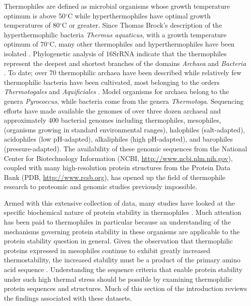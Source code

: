 Thermophiles are defined as microbial organisms whose growth temperature
optimum is above 50$^\circ$C while hyperthermophiles have optimal growth
temperatures of 80$^\circ$C or greater. Since Thomas Brock's description of the
hyperthermophilic bacteria \emph{Thermus aquaticus}, with a growth temperature
optimum of 70$^\circ$C, many other thermophiles and hyperthermophiles have been
isolated \cite{brock1969tag}.  Phylogenetic analysis of 16SrRNA indicate that
the thermophiles represent the deepest and shortest branches of the domains
\emph{Archaea} and \emph{Bacteria} \cite{PMID_10376671}.  To date; over 70
thermophilic archaea have been described while relatively few thermophilic
bacteria have been cultivated, most belonging to the orders
\emph{Thermotogales} and \emph{Aquificiales} \cite{PMID_11256505}. Model
organisms for archaea belong to the genera \emph{Pyrococcus}, while bacteria
come from the genera \emph{Thermotoga}. Sequencing efforts have made
available the genomes of over three dozen archaeal and approximately 400
bacterial genomes including thermophiles, mesophiles, (organisms growing in
standard environmental ranges), halophiles (salt-adapted), acidophiles (low
pH-adapted), alkaliphiles (high pH-adapted), and barophiles (pressure-adapted).
The availability of these genomic sequences from the National Center for
Biotechnology Information (NCBI, \url{http://www.ncbi.nlm.nih.gov}), coupled
with many high-resolution protein structures from the Protein Data Bank (PDB,
\url{http://www.rcsb.org}), has opened up the field of thermophile research to
proteomic and genomic studies previously impossible.  


Armed with this extensive collection of data, many studies have looked at the
specific biochemical nature of protein stability in thermophiles
\cite{jaenicke1998spe,PMID_11577980,PMID_10097079,PMID_10940293,thompson1999tel,PMID_11256505}.
Much attention has been paid to thermophiles in particular because an
understanding of the mechanisms governing protein stability in these organisms
are applicable to the protein stability question in general.  Given the
observation that thermophilic proteins expressed in mesophiles continue to
exhibit greatly increased thermostability, the increased stability must be a
product of the primary amino acid sequence \cite{razvi2006lst}.  Understanding
the sequence criteria that enable protein stability under such high thermal
stress should be possible by examining thermophilic protein sequences and
structures.  Much of this section of the introduction reviews the findings
associated with these datasets.

